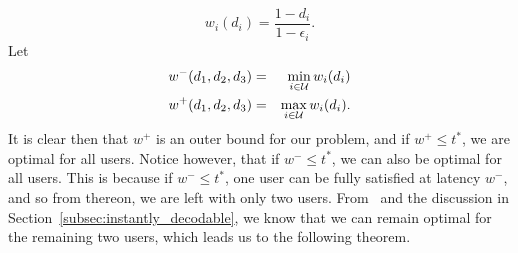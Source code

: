 \begin{equation}
\label{eq:wioptimal}
	w_i(d_i) = \frac{1 - d_i}{1 - \epsilon_i}.
\end{equation}
Let
%
\begin{eqnarray}
\label{eq:w_minus}
	w^{-}(d_1, d_2, d_3) &=& \min_{i \in \mathcal{U}}  w_i (d_i)\\
\label{eq:w_plus}
	w^{+}(d_1, d_2, d_3) &=& \max_{i \in \mathcal{U}} w_i(d_i).
\end{eqnarray}
%
It is clear then that $w^{+}$ is an outer bound for our problem, and if $w^{+} \leq t^{*}$, we are optimal for all users.  Notice however, that if $w^{-} \leq t^{*}$, we can also be optimal for all users.  This is because if $w^{-} \leq t^{*}$, one user can be fully satisfied at latency $w^{-}$, and so from thereon, we are left with only two users.  From~\cite{TMKS_TIT20} and the discussion in Section~\ref{subsec:instantly_decodable}, we know that we can remain optimal for the remaining two users, which leads us to the following theorem.

